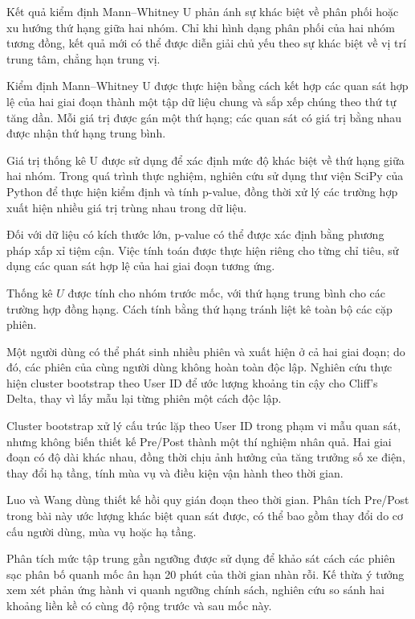\documentclass[conference,a4paper]{IEEEtran}
\begin{document}
Kết quả kiểm định Mann–Whitney U phản ánh sự khác biệt về phân phối hoặc xu hướng thứ hạng giữa hai nhóm. Chỉ khi hình dạng phân phối của hai nhóm tương đồng, kết quả mới có thể được diễn giải chủ yếu theo sự khác biệt về vị trí trung tâm, chẳng hạn trung vị.

Kiểm định Mann–Whitney U được thực hiện bằng cách kết hợp các quan sát hợp lệ của hai giai đoạn thành một tập dữ liệu chung và sắp xếp chúng theo thứ tự tăng dần. Mỗi giá trị được gán một thứ hạng; các quan sát có giá trị bằng nhau được nhận thứ hạng trung bình.

Giá trị thống kê U được sử dụng để xác định mức độ khác biệt về thứ hạng giữa hai nhóm. Trong quá trình thực nghiệm, nghiên cứu sử dụng thư viện SciPy của Python để thực hiện kiểm định và tính p-value, đồng thời xử lý các trường hợp xuất hiện nhiều giá trị trùng nhau trong dữ liệu.

Đối với dữ liệu có kích thước lớn, p-value có thể được xác định bằng phương pháp xấp xỉ tiệm cận. Việc tính toán được thực hiện riêng cho từng chỉ tiêu, sử dụng các quan sát hợp lệ của hai giai đoạn tương ứng.

Thống kê $U$ được tính cho nhóm trước mốc, với thứ hạng trung bình cho các trường hợp đồng hạng. Cách tính bằng thứ hạng tránh liệt kê toàn bộ các cặp phiên.

Một người dùng có thể phát sinh nhiều phiên và xuất hiện ở cả hai giai đoạn; do đó, các phiên của cùng người dùng không hoàn toàn độc lập. Nghiên cứu thực hiện cluster bootstrap theo User ID để ước lượng khoảng tin cậy cho Cliff’s Delta, thay vì lấy mẫu lại từng phiên một cách độc lập.

Cluster bootstrap xử lý cấu trúc lặp theo User ID trong phạm vi mẫu quan sát, nhưng không biến thiết kế Pre/Post thành một thí nghiệm nhân quả. Hai giai đoạn có độ dài khác nhau, đồng thời chịu ảnh hưởng của tăng trưởng số xe điện, thay đổi hạ tầng, tính mùa vụ và điều kiện vận hành theo thời gian.

Luo và Wang \cite{luowang2025} dùng thiết kế hồi quy gián đoạn theo thời gian. Phân tích Pre/Post trong bài này ước lượng khác biệt quan sát được, có thể bao gồm thay đổi do cơ cấu người dùng, mùa vụ hoặc hạ tầng.

Phân tích mức tập trung gần ngưỡng được sử dụng để khảo sát cách các phiên sạc phân bố quanh mốc ân hạn 20 phút của thời gian nhàn rỗi. Kế thừa ý tưởng xem xét phản ứng hành vi quanh ngưỡng chính sách, nghiên cứu so sánh hai khoảng liền kề có cùng độ rộng trước và sau mốc này.
\end{document}
